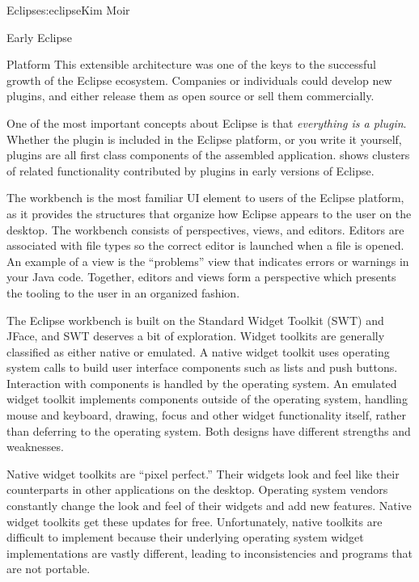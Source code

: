 \begin{aosachapter}{Eclipse}{s:eclipse}{Kim Moir}
\begin{aosasect1}{Early Eclipse}
\begin{aosasect2}{Platform}
This extensible architecture was one of the keys to the successful
growth of the Eclipse ecosystem. Companies or individuals could
develop new plugins, and either release them as open source or sell
them commercially.

One of the most important concepts about Eclipse is that
\emph{everything is a plugin}. Whether the plugin is included in the
Eclipse platform, or you write it yourself, plugins are all first
class components of the assembled
application.  shows clusters of related
functionality contributed by plugins in early versions of Eclipse.


The workbench is the most familiar UI element to users of the Eclipse
platform, as it provides the structures that organize how Eclipse
appears to the user on the desktop. The workbench consists of
perspectives, views, and editors.  Editors are associated with file
types so the correct editor is launched when a file is opened. An
example of a view is the ``problems'' view that indicates errors or
warnings in your Java code. Together, editors and views form a
perspective which presents the tooling to the user in an organized
fashion.

The Eclipse workbench is built on the Standard Widget Toolkit (SWT)
and JFace, and SWT deserves a bit of exploration.  Widget toolkits are
generally classified as either native or emulated.  A native widget
toolkit uses operating system calls to build user interface components
such as lists and push buttons.  Interaction with components is
handled by the operating system. An emulated widget toolkit implements
components outside of the operating system, handling mouse and
keyboard, drawing, focus and other widget functionality itself, rather
than deferring to the operating system.  Both designs have different
strengths and weaknesses.

Native widget toolkits are ``pixel perfect.'' Their widgets look and
feel like their counterparts in other applications on the
desktop. Operating system vendors constantly change the look and feel
of their widgets and add new features. Native widget toolkits get
these updates for free.  Unfortunately, native toolkits are difficult
to implement because their underlying operating system widget
implementations are vastly different, leading to inconsistencies and
programs that are not portable.


\end{aosasect2}
\end{aosasect1}
\end{aosachapter}
